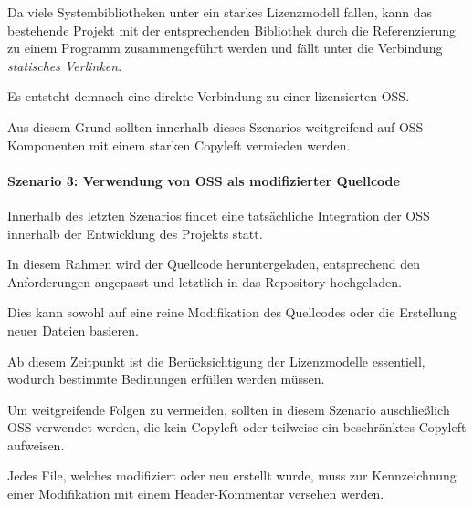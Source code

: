 Da viele Systembibliotheken unter ein starkes Lizenzmodell fallen, kann das bestehende Projekt mit der entsprechenden Bibliothek durch die Referenzierung zu einem Programm zusammengeführt werden und fällt unter die Verbindung \textit{statisches Verlinken}. \cite[S. 211]{jorg_it-vertrage_2007}

Es entsteht demnach eine direkte Verbindung zu einer lizensierten OSS. 

Aus diesem Grund sollten innerhalb dieses Szenarios weitgreifend auf OSS-Komponenten mit einem starken Copyleft vermieden werden. 

\paragraph{Szenario 3: Verwendung von OSS als modifizierter Quellcode}

Innerhalb des letzten Szenarios findet eine tatsächliche Integration der OSS innerhalb der Entwicklung des Projekts statt.

In diesem Rahmen wird der Quellcode heruntergeladen, entsprechend den Anforderungen angepasst und letztlich in das Repository hochgeladen. 

Dies kann sowohl auf eine reine Modifikation des Quellcodes oder die Erstellung neuer Dateien basieren.  

Ab diesem Zeitpunkt ist die Berücksichtigung der Lizenzmodelle essentiell, wodurch bestimmte Bedinungen erfüllen werden müssen. 

Um weitgreifende Folgen zu vermeiden, sollten in diesem Szenario auschließlich OSS verwendet werden, die kein Copyleft oder teilweise ein beschränktes Copyleft aufweisen.

Jedes File, welches modifiziert oder neu erstellt wurde, muss zur Kennzeichnung einer Modifikation mit einem Header-Kommentar versehen werden.

